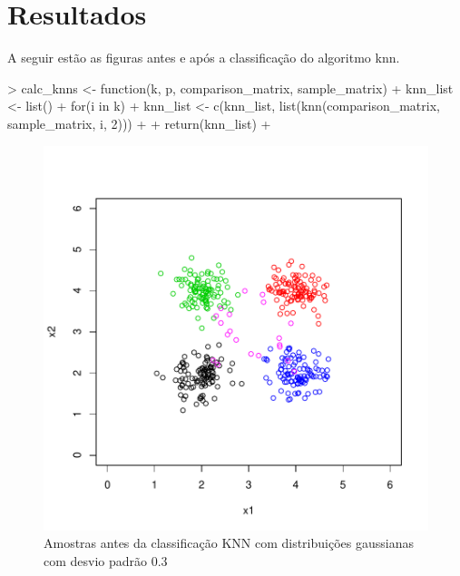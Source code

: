 \documentclass[12pt]{article}
\begin{document}
\section{Resultados}
  \par A seguir estão as figuras antes e após a classificação do algoritmo knn.
  
\begin{Schunk}
\begin{Sinput}
> calc_knns <- function(k, p, comparison_matrix, sample_matrix) {
+   knn_list <- list()
+   for(i in k){
+    knn_list <- c(knn_list, list(knn(comparison_matrix, sample_matrix, i, 2)))
+   }
+   return(knn_list)
+ }
\end{Sinput}
\end{Schunk}

\begin{figure}[h]
\centering
\includegraphics{knn-005}
\caption{Amostras antes da classificação KNN com distribuições gaussianas com desvio padrão 0.3}
\label{sd_0.3}
\end{figure}
\end{document}
